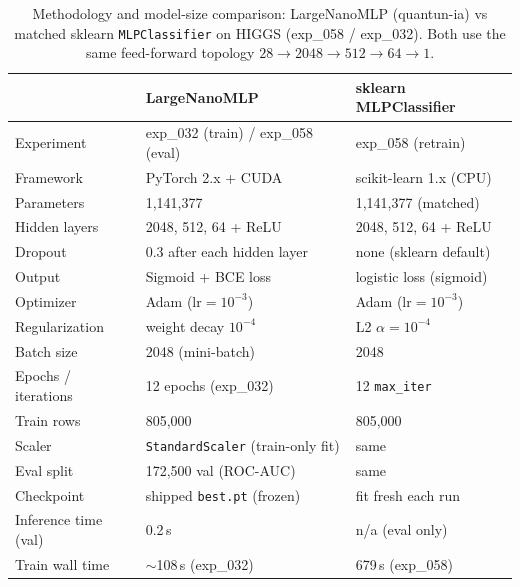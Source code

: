 \begin{table}[ht]
\centering
\caption{Methodology and model-size comparison: LargeNanoMLP (quantun-ia) vs matched
sklearn \texttt{MLPClassifier} on HIGGS (exp\_058 / exp\_032). Both use the same
feed-forward topology $28 \rightarrow 2048 \rightarrow 512 \rightarrow 64 \rightarrow 1$.}
\label{tab:exp_058_methodology}
\small
\begin{tabular}{lll}
\toprule
 & \textbf{LargeNanoMLP} & \textbf{sklearn MLPClassifier} \\
\midrule
Experiment & exp\_032 (train) / exp\_058 (eval) & exp\_058 (retrain) \\
Framework & PyTorch 2.x + CUDA & scikit-learn 1.x (CPU) \\
Parameters & 1{,}141{,}377 & 1{,}141{,}377 (matched) \\
Hidden layers & 2048, 512, 64 + ReLU & 2048, 512, 64 + ReLU \\
Dropout & 0.3 after each hidden layer & none (sklearn default) \\
Output & Sigmoid + BCE loss & logistic loss (sigmoid) \\
Optimizer & Adam ($\mathrm{lr}{=}10^{-3}$) & Adam ($\mathrm{lr}{=}10^{-3}$) \\
Regularization & weight decay $10^{-4}$ & L2 $\alpha{=}10^{-4}$ \\
Batch size & 2048 (mini-batch) & 2048 \\
Epochs / iterations & 12 epochs (exp\_032) & 12 \texttt{max\_iter} \\
Train rows & 805{,}000 & 805{,}000 \\
Scaler & \texttt{StandardScaler} (train-only fit) & same \\
Eval split & 172{,}500 val (ROC-AUC) & same \\
Checkpoint & shipped \texttt{best.pt} (frozen) & fit fresh each run \\
Inference time (val) & 0.2\,s & n/a (eval only) \\
Train wall time & $\sim$108\,s (exp\_032) & 679\,s (exp\_058) \\
\bottomrule
\end{tabular}
\end{table}
